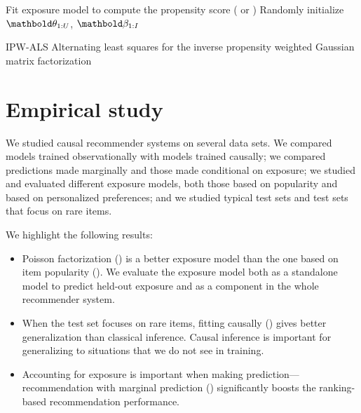 \begin{algorithm}
\DontPrintSemicolon %
Fit exposure model to compute the propensity score ( or )\;
Randomly initialize $\mb\theta_{1:U}$, $\mb\beta_{1:I}$\;
\;
\caption{{\sc IPW-ALS} Alternating least squares for the inverse propensity weighted Gaussian matrix factorization}
\label{chpt:causal_rec:algo:gmf}
\end{algorithm}


\section{Empirical study}\label{chpt:causal_rec:sec:exp}

We studied causal recommender systems on several data sets. We
compared models trained observationally with models trained causally;
we compared predictions made marginally and those made conditional on
exposure; we studied and evaluated different exposure models, both
those based on popularity and based on personalized preferences; and
we studied typical test sets and test sets that focus on rare
items.

We highlight the following results:
\begin{itemize}
\item Poisson factorization () is a
  better
  exposure model than the one based on item popularity
  (). We evaluate
  the exposure model both as a standalone model to predict held-out
  exposure and as a component in the whole recommender system.

\item When the test set focuses on rare items, fitting causally
  ()
  gives better generalization than classical inference. Causal
  inference is
  important for generalizing to situations that we do not see in
  training.

\item Accounting for exposure is important when making
  prediction---recommendation with marginal prediction
  () significantly
  boosts the ranking-based recommendation performance.

\end{itemize}

